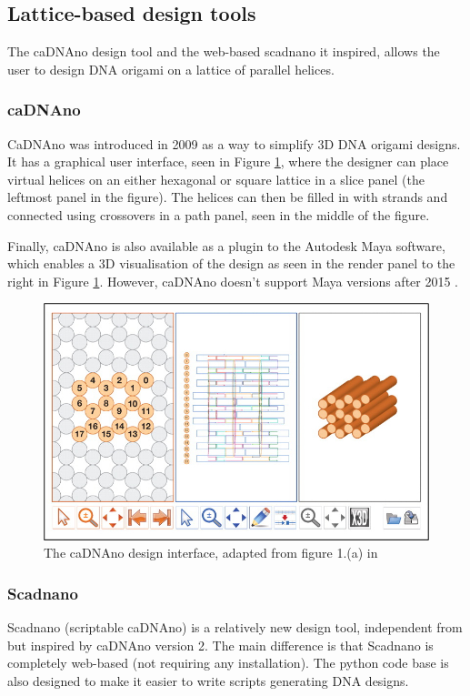 \subsection{Lattice-based design tools}
The caDNAno design tool \cite{cadnano} and the web-based scadnano\cite{scadnano} it inspired, allows the user to design DNA origami on a lattice of parallel helices.
\subsubsection{caDNAno}
CaDNAno \cite{cadnano} was introduced in 2009 as a way to simplify 3D DNA origami designs. It has a graphical user interface, seen in Figure \ref{fig:cadnano}, where the designer can place virtual helices on an either hexagonal or square lattice in a slice panel (the leftmost panel in the figure). The helices can then be filled in with strands and connected using crossovers in a path panel, seen in the middle of the figure.

Finally, caDNAno is also available as a plugin to the Autodesk Maya software, which enables a 3D visualisation of the design as seen in the render panel to the right in Figure \ref{fig:cadnano}. However, caDNAno doesn't support Maya versions after 2015 \cite{cadnanoInstall}.

\begin{figure}[h]
  \begin{center}
      \includegraphics[width=\textwidth]{figures/cadnano.jpeg}
      \caption{The caDNAno design interface, adapted from figure 1.(a) in \cite{cadnano}}
      \label{fig:cadnano}
      \end{center}
  \end{figure}

\subsubsection{Scadnano}
Scadnano \cite{scadnano} (scriptable caDNAno) is a relatively new design tool, independent from but inspired by caDNAno version 2. The main difference is that Scadnano is completely web-based (not requiring any installation). The python code base is also designed to make it easier to write scripts generating DNA designs.

